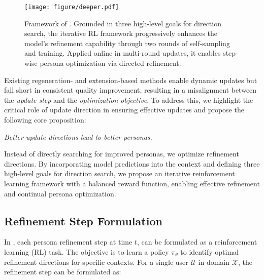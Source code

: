 
\begin{figure*}[t]
    \centering
    \texttt{[image: figure/deeper.pdf]}
    \caption{Framework of \method. Grounded in three high-level goals for direction search, the iterative RL framework progressively enhances the model’s refinement capability through two rounds of self-sampling and training. Applied online in multi-round updates, it enables step-wise persona optimization via directed refinement.}
    \label{fig:deeper}
\end{figure*}


Existing regeneration- and extension-based methods enable dynamic updates but fall short in consistent quality improvement, resulting in a misalignment between the \textit{update step} and the \textit{optimization objective}. To address this, we highlight the critical role of update direction in ensuring effective updates and propose the following core proposition:

\noindent  
\textit{Better update directions lead to better personas.}

\noindent 
Instead of directly searching for improved personas, we optimize refinement directions. By incorporating model predictions into the context and defining three high-level goals for direction search, we propose an iterative reinforcement learning framework with a balanced reward function, enabling effective refinement and continual persona optimization.



\subsection{Refinement Step Formulation}

In \method, each persona refinement step at time $t$, can be formulated as a reinforcement learning (RL) task.
The objective is to learn a policy $\pi_\theta$ to identify optimal refinement directions for specific contexts. For a single user $\mathcal{U}$ in domain $\mathcal{X}$, the refinement step can be formulated as:

